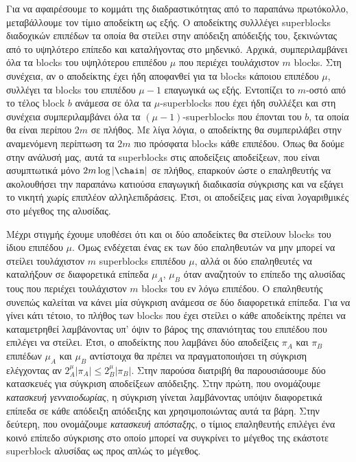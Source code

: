 Για να αφαιρέσουμε το κομμάτι της διαδραστικότητας από το παραπάνω πρωτόκολλο, μεταβάλλουμε τον τίμιο
αποδείκτη ως εξής. Ο αποδείκτης συλλλέγει superblocks διαδοχικών επιπέδων τα οποία θα στείλει
στην απόδειξη απόδειξής του, ξεκινώντας από το υψηλότερο επίπεδο και καταλήγοντας στο μηδενικό.
Αρχικά, συμπεριλαμβάνει όλα τα blocks του υψηλότερου επιπέδου $\mu$ που
περιέχει τουλάχιστον $m$ blocks. Στη συνέχεια, αν ο αποδείκτης έχει ήδη αποφανθεί για τα blocks
κάποιου επιπέδου $\mu$, συλλέγει τα blocks του επιπέδου $\mu - 1$ επαγωγικά ως εξής.
Εντοπίζει το $m$-οστό από το τέλος block $b$ ανάμεσα σε όλα τα $\mu$-superblocks που έχει ήδη
συλλέξει και στη συνέχεια συμπεριλαμβάνει όλα τα $(\mu - 1)$-superblocks που έπονται του $b$,
τα οποία θα είναι περίπου $2m$ σε πλήθος. Με λίγα λόγια, ο αποδείκτης θα συμπεριλάβει στην
αναμενόμενη περίπτωση τα $2m$ πιο πρόσφατα blocks κάθε επιπέδου. Όπως θα δούμε στην ανάλυσή μας,
αυτά τα superblocks στις αποδείξεις αποδείξεων, που είναι ασυμπτωτικά μόνο $2m \log|\chain|$ σε πλήθος,
επαρκούν ώστε ο επαληθευτής να ακολουθήσει την παραπάνω κατιούσα επαγωγική διαδικασία σύγκρισης και
να εξάγει το νικητή χωρίς επιπλέον αλληλεπιδράσεις. Έτσι, οι αποδείξεις μας είναι λογαριθμικές στο
μέγεθος της αλυσίδας.

Μέχρι στιγμής έχουμε υποθέσει ότι και οι δύο αποδείκτες θα στείλουν blocks του ίδιου επιπέδου $\mu$.
Όμως ενδέχεται ένας εκ των δύο επαληθευτών να μην μπορεί να στείλει τουλάχιστον $m$ superblocks επιπέδου
$\mu$, αλλά οι δύο επαληθευτές να καταλήξουν σε διαφορετικά επίπεδα $\mu_A$, $\mu_B$ όταν αναζητούν
το επίπεδο της αλυσίδας τους που περιέχει τουλάχιστον $m$ blocks του εν λόγω επιπέδου. Ο επαληθευτής
συνεπώς καλείται να κάνει μία σύγκριση ανάμεσα σε δύο διαφορετικά επίπεδα. Για να γίνει κάτι τέτοιο,
το πλήθος των blocks που έχει στείλει ο κάθε αποδείκτης πρέπει να καταμετρηθεί λαμβάνοντας υπ' όψιν
το βάρος της σπανιότητας του επιπέδου που επιλέγει να στείλει. Έτσι, ο αποδείκτης που λαμβάνει δύο
αποδείξεις $\pi_A$ και $\pi_B$ επιπέδων $\mu_A$ και $\mu_B$ αντίστοιχα θα πρέπει να πραγματοποιήσει
τη σύγκριση ελέγχοντας αν $2^\mu_A |\pi_A| \leq 2^\mu_B |\pi_B|$. Στην παρούσα διατριβή θα παρουσιάσουμε
δύο κατασκευές για σύγκριση αποδείξεων απόδειξης. Στην πρώτη, που ονομάζουμε
\emph{κατασκευή γενναιοδωρίας}, η σύγκριση γίνεται λαμβάνοντας υπόψιν διαφορετικά επίπεδα σε κάθε
απόδειξη απόδειξης και χρησιμοποιώντας αυτά τα βάρη. Στην δεύτερη, που ονομάζουμε
\emph{κατασκευή απόσταξης}, ο τίμιος επαληθευτής επιλέγει ένα κοινό επίπεδο σύγκρισης στο οποίο μπορεί
να συγκρίνει το μέγεθος της εκάστοτε superblock αλυσίδας ως προς απλώς το μέγεθος.

